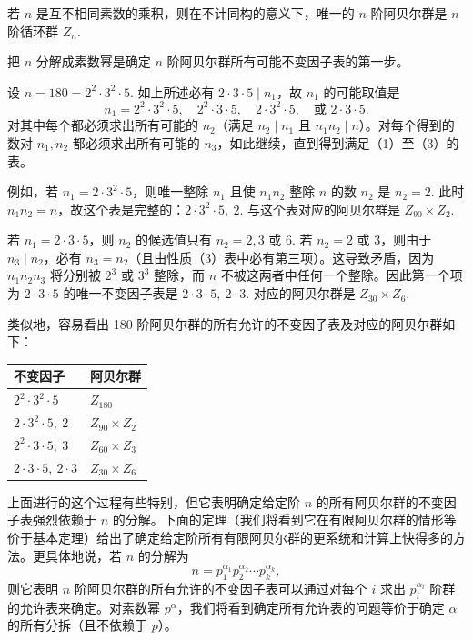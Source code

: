\begin{corollary}\label{cor:5.4}
若 \(n\) 是互不相同素数的乘积，则在不计同构的意义下，唯一的 \(n\) 阶阿贝尔群是 \(n\) 阶循环群 \(Z_n\).
\end{corollary}

把 \(n\) 分解成素数幂是确定 \(n\) 阶阿贝尔群所有可能不变因子表的第一步。

\begin{example}
设 \(n = 180 = 2^2 \cdot 3^2 \cdot 5\). 如上所述必有 \(2 \cdot 3 \cdot 5 \mid n_1\)，故 \(n_1\) 的可能取值是
\[
n_1 = 2^2 \cdot 3^2 \cdot 5,\quad 2^2 \cdot 3 \cdot 5,\quad 2 \cdot 3^2 \cdot 5,\quad \text{或 } 2 \cdot 3 \cdot 5.
\]
对其中每个都必须求出所有可能的 \(n_2\)（满足 \(n_2 \mid n_1\) 且 \(n_1n_2 \mid n\)）。对每个得到的数对 \(n_1, n_2\) 都必须求出所有可能的 \(n_3\)，如此继续，直到得到满足（1）至（3）的表。

例如，若 \(n_1 = 2 \cdot 3^2 \cdot 5\)，则唯一整除 \(n_1\) 且使 \(n_1n_2\) 整除 \(n\) 的数 \(n_2\) 是 \(n_2 = 2\). 此时 \(n_1n_2 = n\)，故这个表是完整的：\(2 \cdot 3^2 \cdot 5,\ 2\). 与这个表对应的阿贝尔群是 \(Z_{90} \times Z_2\).

若 \(n_1 = 2 \cdot 3 \cdot 5\)，则 \(n_2\) 的候选值只有 \(n_2 = 2, 3\) 或 6. 若 \(n_2 = 2\) 或 3，则由于 \(n_3 \mid n_2\)，必有 \(n_3 = n_2\)（且由性质（3）表中必有第三项）。这导致矛盾，因为 \(n_1n_2n_3\) 将分别被 \(2^3\) 或 \(3^3\) 整除，而 \(n\) 不被这两者中任何一个整除。因此第一个项为 \(2 \cdot 3 \cdot 5\) 的唯一不变因子表是 \(2 \cdot 3 \cdot 5,\ 2 \cdot 3\). 对应的阿贝尔群是 \(Z_{30} \times Z_6\).

类似地，容易看出 180 阶阿贝尔群的所有允许的不变因子表及对应的阿贝尔群如下：

\begin{center}
\begin{tabular}{ll}
\hline
不变因子 & 阿贝尔群 \\
\hline
\(2^2 \cdot 3^2 \cdot 5\) & \(Z_{180}\) \\
\(2 \cdot 3^2 \cdot 5,\ 2\) & \(Z_{90} \times Z_2\) \\
\(2^2 \cdot 3 \cdot 5,\ 3\) & \(Z_{60} \times Z_3\) \\
\(2 \cdot 3 \cdot 5,\ 2 \cdot 3\) & \(Z_{30} \times Z_6\) \\
\hline
\end{tabular}
\end{center}
\end{example}

上面进行的这个过程有些特别，但它表明确定给定阶 \(n\) 的所有阿贝尔群的不变因子表强烈依赖于 \(n\) 的分解。下面的定理（我们将看到它在有限阿贝尔群的情形等价于基本定理）给出了确定给定阶所有有限阿贝尔群的更系统和计算上快得多的方法。更具体地说，若 \(n\) 的分解为
\[
n = p_1^{\alpha_1} p_2^{\alpha_2} \cdots p_k^{\alpha_k},
\]
则它表明 \(n\) 阶阿贝尔群的所有允许的不变因子表可以通过对每个 \(i\) 求出 \(p_i^{\alpha_i}\) 阶群的允许表来确定。对素数幂 \(p^\alpha\)，我们将看到确定所有允许表的问题等价于确定 \(\alpha\) 的所有分拆（且不依赖于 \(p\)）。

